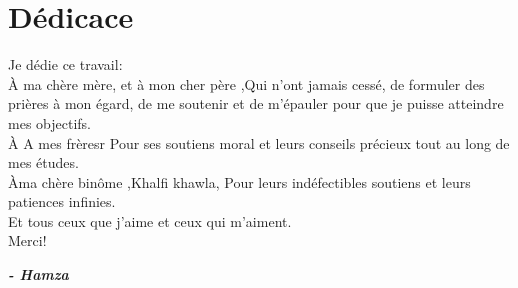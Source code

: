 \chapter*{Dédicace}

\begin{fquote}
	\begin{center}
		\large{
			Je dédie ce travail:\\[12pt]
			\uppercase{à} ma chère mère, et à mon cher père ,Qui n'ont jamais cessé, de formuler des prières à mon égard, de me soutenir
			et de m'épauler pour que je puisse atteindre mes objectifs.
			\\[12pt]
			\uppercase{à} A mes frèresr Pour ses soutiens moral et leurs conseils précieux tout au long de mes études.
			\\[12pt]
			\uppercase{à}ma chère binôme ,Khalfi khawla, Pour leurs indéfectibles soutiens et leurs patiences infinies.
			\\[12pt]
			\uppercase{E}t tous ceux que j’aime et ceux qui m’aiment.\\[12pt]
			Merci!
		}
	\end{center}
	\bigskip
	\medskip
\end{fquote}

\begin{adjustwidth}{2cm}{1cm}
	\hspace*{\fill} \textbf{\textit{\large{- Hamza}}}
\end{adjustwidth}

\clearpage